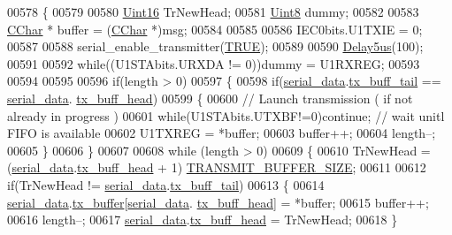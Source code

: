 \begin{DoxyCode}
00578 \{
00579   
00580     \hyperlink{a00072_a59a9f6be4562c327cbfb4f7e8e18f08b}{Uint16} TrNewHead;
00581     \hyperlink{a00072_af84840501dec18061d18a68c162a8fa2}{Uint8}  dummy;
00582 
00583     \hyperlink{a00072_ab151ad5c5a3b673cb8815c87ed7f706c}{CChar} * buffer = (\hyperlink{a00072_ab151ad5c5a3b673cb8815c87ed7f706c}{CChar} *)msg;
00584 
00585 
00586     IEC0bits.U1TXIE    = 0;
00587 
00588     serial\_enable\_transmitter(\hyperlink{a00040_aa8cecfc5c5c054d2875c03e77b7be15d}{TRUE});
00589 
00590     \hyperlink{a00033_a3b0017f6ec0e04a6435bba00fe325294}{Delay5us}(100);
00591     
00592     \textcolor{keywordflow}{while}((U1STAbits.URXDA != 0))dummy = U1RXREG;
00593     
00594 
00595 
00596     \textcolor{keywordflow}{if}(length > 0)
00597     \{
00598         \textcolor{keywordflow}{if}(\hyperlink{a00030_a77d3b77ccd59a0065642bf1ac7887b9d}{serial\_data}.\hyperlink{a00030_a6287e1447d7902b8bbc2f6359065dcbd}{tx\_buff\_tail} == \hyperlink{a00030_a77d3b77ccd59a0065642bf1ac7887b9d}{serial\_data}.
      \hyperlink{a00030_a3e2eda0a020422511de91b2bc7386083}{tx\_buff\_head})
00599         \{
00600             \textcolor{comment}{// Launch transmission ( if not already in progress )}
00601             \textcolor{keywordflow}{while}(U1STAbits.UTXBF!=0)\textcolor{keywordflow}{continue}; \textcolor{comment}{// wait unitl FIFO is available}
00602             U1TXREG = *buffer;
00603             buffer++;
00604             length--;
00605         \}
00606     \}
00607 
00608     \textcolor{keywordflow}{while} (length > 0)
00609     \{
00610         TrNewHead = (\hyperlink{a00030_a77d3b77ccd59a0065642bf1ac7887b9d}{serial\_data}.\hyperlink{a00030_a3e2eda0a020422511de91b2bc7386083}{tx\_buff\_head} + 1)%
      \hyperlink{a00031_aef714b16a48390956c10e8aa18d156b8}{TRANSMIT\_BUFFER\_SIZE};
00611 
00612         \textcolor{keywordflow}{if}(TrNewHead != \hyperlink{a00030_a77d3b77ccd59a0065642bf1ac7887b9d}{serial\_data}.\hyperlink{a00030_a6287e1447d7902b8bbc2f6359065dcbd}{tx\_buff\_tail})
00613         \{
00614             \hyperlink{a00030_a77d3b77ccd59a0065642bf1ac7887b9d}{serial\_data}.\hyperlink{a00030_a327864d2719b5145f0eded883fe321c5}{tx\_buffer}[\hyperlink{a00030_a77d3b77ccd59a0065642bf1ac7887b9d}{serial\_data}.
      \hyperlink{a00030_a3e2eda0a020422511de91b2bc7386083}{tx\_buff\_head}] = *buffer;
00615             buffer++;
00616             length--;
00617             \hyperlink{a00030_a77d3b77ccd59a0065642bf1ac7887b9d}{serial\_data}.\hyperlink{a00030_a3e2eda0a020422511de91b2bc7386083}{tx\_buff\_head} = TrNewHead;
00618         \}

\end{DoxyCode}
